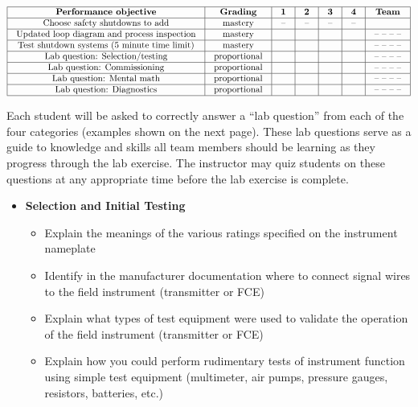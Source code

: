 $$\vbox{\offinterlineskip
\halign{\strut
\vrule \quad\hfil # \ \hfil & 
\vrule \quad\hfil # \ \hfil & 
\vrule \quad\hfil # \ \hfil & 
\vrule \quad\hfil # \ \hfil & 
\vrule \quad\hfil # \ \hfil & 
\vrule \quad\hfil # \ \hfil & 
\vrule \quad\hfil # \ \hfil \vrule \cr
\noalign{\hrule}
%
{\bf Performance objective} & {\bf Grading} & {\bf 1} & {\bf 2} & {\bf 3} & {\bf 4} & {\bf Team} \cr
%
\noalign{\hrule}
%
Choose safety shutdowns to add & mastery & -- & -- & -- & -- & \cr
%
\noalign{\hrule}
%
Updated loop diagram and process inspection & mastery & & & & & -- -- -- -- \cr
%
\noalign{\hrule}
%
Test shutdown systems (5 minute time limit) & mastery & & & & & -- -- -- -- \cr
%
\noalign{\hrule}
%
Lab question: Selection/testing & proportional &  &  &  &  & -- -- -- -- \cr
%
\noalign{\hrule}
%
Lab question: Commissioning & proportional &  &  &  &  & -- -- -- -- \cr
%
\noalign{\hrule}
%
Lab question: Mental math & proportional &  &  &  &  & -- -- -- -- \cr
%
\noalign{\hrule}
%
Lab question: Diagnostics & proportional &  &  &  &  & -- -- -- -- \cr
%
\noalign{\hrule}
} %
}$$ %

Each student will be asked to correctly answer a ``lab question'' from each of the four categories (examples shown on the next page).  These lab questions serve as a guide to knowledge and skills all team members should be learning as they progress through the lab exercise.  The instructor may quiz students on these questions at any appropriate time before the lab exercise is complete.

\vfil \eject

\noindent
{} 

\begin{itemize}
\item{} {\bf Selection and Initial Testing}
\begin{itemize}

\item{} Explain the meanings of the various ratings specified on the instrument nameplate
\item{} Identify in the manufacturer documentation where to connect signal wires to the field instrument (transmitter or FCE)
\item{} Explain what types of test equipment were used to validate the operation of the field instrument (transmitter or FCE)
\item{} Explain how you could perform rudimentary tests of instrument function using simple test equipment (multimeter, air pumps, pressure gauges, resistors, batteries, etc.)
\end{itemize}
\end{itemize}

